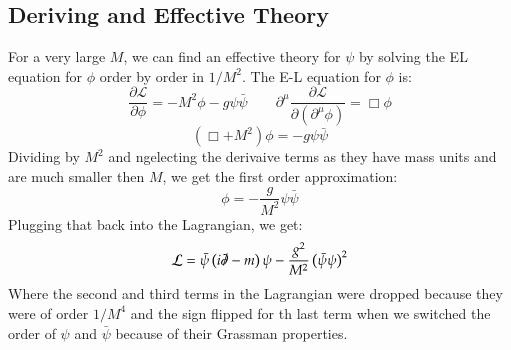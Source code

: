 \documentclass{article}
\begin{document}
\subsection{Deriving and Effective Theory}
For a very large $M$, we can find an effective theory for $\psi$ by solving the EL equation for $\phi$ order by order in $1/M^2$. The E-L equation for $\phi$ is:
\begin{equation}
    \frac{\partial \mathcal{L}}{\partial \phi} = -M^2 \phi - g\psi\bar{\psi}
    \qquad
    \partial^\mu \frac{\partial \mathcal{L}}{\partial\left(\partial^\mu \phi\right)} = \Box \phi
\end{equation}
\begin{equation}
    \left(\Box + M^2\right)\phi = -g\psi\bar{\psi}
\end{equation}
Dividing by $M^2$ and ngelecting the derivaive terms as they have mass units and are much smaller then $M$, we get the first order approximation:
\begin{equation}
    \phi = -\frac{g}{M^2}\psi\bar{\psi}
\end{equation}
Plugging that back into the Lagrangian, we get:
\begin{equation}
    \mathcal{L} = \bar{\psi}\left(i\slashed{\partial} - m\right)\psi - \frac{g^2}{M^2}\left(\bar{\psi}\psi\right)^2
\end{equation}
Where the second and third terms in the Lagrangian were dropped because they were of order $1/M^4$ and the sign flipped for th last term when we switched the order of $\psi$ and $\bar{\psi}$ because of their Grassman properties.
\end{document}

